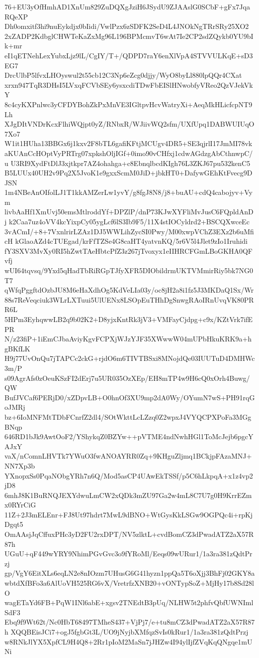 76+EU3yOfHmhAD1XnUm829ZuDQXgJziH6JSydU9ZJAAslG0SCbF+gFx7JqaRQeXP
Dh0omxitf3hi9nuEykdjx0bIidi/VwlPzx6zSDFK2SeD4L4JNOkNgTRrSRy25XO2
2xZADP2KdbglCHWTeKaZxMg96L196BPMcmvT6wAt7Ie2CP2sdZQykb0YU9bIk+mr
eI1qETNehLexYubxLjz9lL/CgIY/T+/QDPD7raY6enXlVpA4STVVULKqE+sD3EG7
DrcUlbP5lfvxLHOyswul2t55cb12C3Np6eZcg0djjy/WyO8byLl880lpQQr4CXat
xrxn947TqR3DHsI5LVxqFCVbSEy6ysxcdiTDwFbEISlHNwobfyVReo2QzVJekVkY
8c4cyKXPnlwc3yCFDYBohZkPxMnVE3IGltpvHcvWatryXi+AeqMkHLicfcpNT9Lh
XJgDItVNDrKcxFlhiWQjpt0yZ/RNbxR/WJiivWQ2sfm/UXfUpq1DABWUIUqO7Xo7
W1it1HUha13BBGx6j1kxv2F8bTL6gafiKFtjMCUgv4DR5+SE3qjrlI17JmMI78vk
aKUAnCcHOptVyPRTrg07xpkshOljIGf+0imo90vCHfxj1cdwAGdzgAbCthnwpC/u
U3RI9XydFtDlJ3xjtkpr7AZ4ohahga+c8EbnqlbcdKIgh76L3ZKJ67pu532kenC5
B5LUUx40UH2v9Pq2X5JvoK1e9gxxScmM0JiD+jbkHT0+DafywGEhKtFvecg9DJSN
1m4NBeAnOIfolLJ1T1kkAMZerLw1yvY/g8fgJ8N8/j8+buAU+cdQ4cabojyv+Vym
livbAaHf1XmUvj50emsMtlroddYf+DPZlP/dnP73KJwXYFliMvJusC6FQpldAnDj
k2Caa7uz4oVV4kcYixpCy05ygLcf6lS3Ib9F5/11X4stIOCyldrd2+BSCQXwceEc
3vACmI/+8+7VxnlrirLZAz1DJ5WWLihZycSI0Pwy/M00xwpVChZ3EXz2b6uMficH
kGlaoAZd4cTUEgad/krFfTZSe4G8caHT4yatvnKQ/5r6V5l4Jlet9zIo1Iruhidi
fY3SXV3MvXy0RI5hZwtTAeHbtcPfZ3z267jTvoxyx1eIIHRCFGmLBoGKHA0QFvfj
wUI64tqvsq/9Yxd5qHadTbRiRGpTJfyXFR5DIObildrmUKTVMmirRiy5bk7NG0T7
qWfqPggftdOzbJU8M6eHaXdhOg5KdVeLIa03y/oc8jH2a8i1fz5J3MKDaQ1Sx/Wr
88s7ReVeqciuk3WLrLXTuui5UlUENx8LSOpEuTHhDgSnwgRAoIRnUvqVK80PRR6L
5HPm3EyhqwwLB2q9b02K2+D8yjxKntRk3jV3+VMFayCjdpg+c9x/KZtVrk7ifEPR
N/z23fiP+1iEmCJbaAviyKgvFCPXjWJzYJF35XWwwW04mUPbHkuKRK9a+hgBKfLK
H9j77UvOnQu7jTAPCc2ckG+rjdO6m6TIVTBSxi8MNojdQe03IUUTuD4DMHWc3m/P
s09AgrAfs0zOeuKSzFI2dErj7u5UR035OzXEp/EH8mTP4w9H6cQ0xOrh4Buwg/QW
BufJVCaf6PERjD0/xZDpvLB+O0hnOf3XU9mp2dA0Wy/OYumN7wS+PH91rqGoJMRj
bz+6IoMNFMtTDbFCnrfZ2dl4/SOtWkttLcLZzq0Z2wpxJ4VYQCPXPoFa3MGgBNqp
646RD1bJk9AwtOoF2/YShykqZ0BZYw++pVTME4ndNwhHGl1ToMcJejb6pgcYAJxY
vaX/nComnLHVTk7YWuO3fwANOAYRR0Zq+9KHguZljmq1BCkjpFAzaMNJ+NN7Xp3b
YXnopxSs0PqaNObgYRh7n6Q/Mod5asCP4UAwEkTSSf/p5C6hLkpqA+x1z4vp2jD8
6mhJ8K1BuRNQJEXYdwuLmCW2xQDk3mZU97Ga2w4mL8C7U7g0H9KrrEZmx0RYrCiG
11Z+2J3mELEnr+FJ8Ut97hdrt7MwL9dBNO+WtGysKkLSGw9OGPQc4i+rpKjDgqt5
OmAAsjJqCffuxPHc3yD2FU2rxDPT/NV5zlktL+cvdBomCZ3dPwadATZ2aX57R87h
UGuU+qF449wYRY9NhimPGvGvc3o9fYRoMl/Eeqs09wURur1/1a3ra381zQdtPrzj
gp/VgY6EitXLs6eqLN2e8nIOzm7UHusG6G41hyzn1ppQa5T6oXjj3BhFj02GKY8a
wbtdXfBFo3a6AlUoVH525RG6vX/VretrfzXNB20+vONTypSoZ+MjHy17b8Sd28lO
wagETaYd6FB+PqW1INl6abE+xgsv2TNEdtB3pUq/NLHW5t2phfvQbfUWNImlSdF3
Ebq9f9Wt62t/Nc0HbT68497TMheS437+VjPj7/e+tu8mCZ3dPwadATZ2aX57R87h
XQQBEisJCi7+ogJ5fgbGt3L/UO9jNyjbXMfqzSvIs0kRur1/1a3ra381zQdtPrzj
w8RNkJlYX5XpfCL9H4Q8+2Rr1pIoM2MaSn7jJHZw4I94ylIjfZVqKqQNgqe1mUNi
